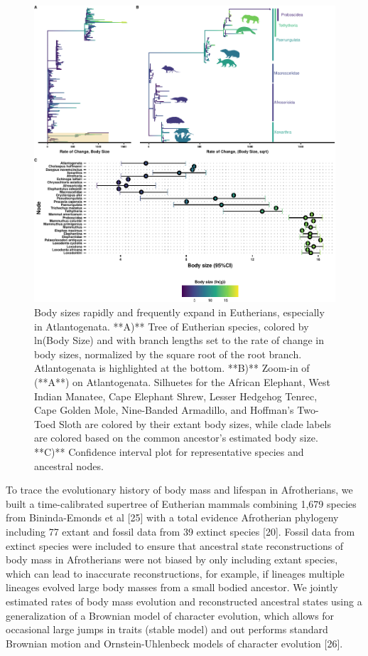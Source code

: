 \documentclass[]{elsarticle} %
\begin{document}
\begin{figure}

\includegraphics[width=6in]{paper_PLOS_draft_files/figure-latex/Figure1-1} \hfill{}

\caption{Body sizes rapidly and frequently expand in Eutherians, especially in Atlantogenata. **A)** Tree of Eutherian species, colored by ln(Body Size) and with branch lengths set to the rate of change in body sizes, normalized by the square root of the root branch. Atlantogenata is highlighted at the bottom. **B)** Zoom-in of (**A**) on Atlantogenata. Silhuetes for the African Elephant, West Indian Manatee, Cape Elephant Shrew, Lesser Hedgehog Tenrec, Cape Golden Mole, Nine-Banded Armadillo, and Hoffman's Two-Toed Sloth are colored by their extant body sizes, while clade labels are colored based on the common ancestor's estimated body size. **C)** Confidence interval plot for representative species and ancestral nodes.}\label{fig:Figure1}
\end{figure}

To trace the evolutionary history of body mass and lifespan in
Afrotherians, we built a time-calibrated supertree of Eutherian mammals
combining 1,679 species from Bininda-Emonds et al {[}25{]} with a total
evidence Afrotherian phylogeny including 77 extant and fossil data from
39 extinct species {[}20{]}. Fossil data from extinct species were
included to ensure that ancestral state reconstructions of body mass in
Afrotherians were not biased by only including extant species, which can
lead to inaccurate reconstructions, for example, if lineages multiple
lineages evolved large body masses from a small bodied ancestor. We
jointly estimated rates of body mass evolution and reconstructed
ancestral states using a generalization of a Brownian model of character
evolution, which allows for occasional large jumps in traits (stable
model) and out performs standard Brownian motion and Ornstein-Uhlenbeck
models of character evolution {[}26{]}.
\end{document}
